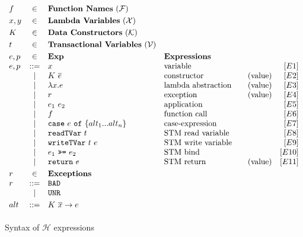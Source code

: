 \documentclass[submission,copyright,creativecommons]{eptcs}
\newcommand{\code}[1]{\textrm{{\tt #1}}}
\newcommand{\caseof}[2]{\code{case} \ #1 \ \code{of} \ #2 }
\newcommand{\readTVarONLY}{\ensuremath{\code{readTVar}}}
\newcommand{\readTVar}[1]{\ensuremath{\readTVarONLY \ #1}}
\newcommand{\writeTVarONLY}{\ensuremath{\code{writeTVar}}}
\newcommand{\writeTVar}[2]{\ensuremath{\writeTVarONLY \ #1 \ #2}}
\newcommand{\bindTM}{\ \ensuremath{\code{>>=}} \ }
\newcommand{\returnTMONLY}{\ensuremath{\code{return}}}
\newcommand{\returnTM}[1]{\ensuremath{\returnTMONLY \ #1}}
\begin{document}
\begin{figure*}[htb]
  \centering
\begin{math}
    \begin{array}{lcllrrr}




      f   & \in & \textbf{Function Names} \ (\mathcal{F}) \ \smallskip \\

      x,y & \in & \textbf{Lambda Variables} \ (\mathcal{X}) \smallskip \\ 

      K   & \in & \textbf{Data Constructors} \ (\mathcal{K}) \smallskip \\

      t   & \in & \textbf{Transactional Variables} \ (\mathcal{V}) \smallskip \\

      e,p & \in & \textbf{Exp}              & \mbox{\textbf{Expressions}} \\ 
      e,p & ::= & x                        & \mbox{variable}                &  & & [E1] \\
          &  |  & K \ \overline{e}         & \mbox{constructor}             &  &\mbox{(value)} & [E2]\\
          &  |  & \lambda x.e              & \mbox{lambda abstraction}      & &\mbox{(value)} & [E3]\\
          &  |  & r                        & \mbox{exception}               &  &\mbox{(value)} & [E4]\\
          &  |  & e_1 \ e_2                & \mbox{application}             &  && [E5]\\
          &  |  & f                        & \mbox{function call}           & && [E6]\\
          &  |  & \caseof{e}{\{alt_1...alt_n\}} & \mbox{case-expression}    &  && [E7]\\ 
&  |  & \readTVar{t}             & \mbox{STM read variable}       &  && [E8]\\
          &  |  & \writeTVar{t}{e}         & \mbox{STM write variable}      &  && [E9]\\
          &  |  & e_1 \bindTM e_2          & \mbox{STM bind}                    &  && [E10]\\
          &  |  & \returnTM{e}             & \mbox{STM return}                  &  &\mbox{(value)}& [E11]\smallskip \\ 


      r   & \in & \textbf{Exceptions} \\
      r   & ::= & \code{BAD} \\ 
          &  |  & \code{UNR} \smallskip \\

      alt & ::= & K \ \overline{x} -> e \smallskip \\



    \end{array}
  \end{math}\caption{Syntax of $\mathcal{H}$ expressions}
\label{syntax-expression}
\end{figure*}
\end{document}
